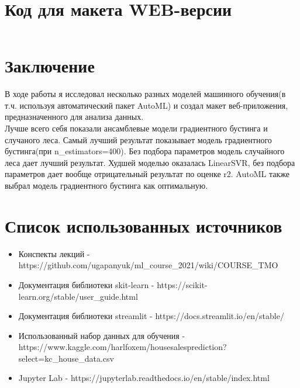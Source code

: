 \documentclass[11pt]{report}
\begin{document}
\chapter{Код для макета WEB-версии}
\inputminted[tabsize=4, linenos, breaklines]{python}{app.py}

\chapter{Заключение}

\qquad В ходе работы я исследовал несколько разных моделей машинного обучения(в т.ч. используя автоматический пакет AutoML) и создал макет веб-приложения, предназначенного для анализа данных. \\
\qquad Лучше всего себя показали ансамблевые модели градиентного бустинга и
случаного леса. Самый лучший результат показывает модель градиентного
бустинга(при n\_estimators=400). Без подбора параметров модель
случайного леса дает лучший результат. Худшей моделью оказалась
LinearSVR, без подбора параметров дает вообще отрицательный результат по
оценке r2. AutoML также выбрал модель градиентного бустинга как
оптимальную. \\

\chapter{Список использованных источников}
\begin{itemize}
		\item Конспекты лекций - https://github.com/ugapanyuk/ml\_course\_2021/wiki/COURSE\_TMO
		\item Документация библиотеки skit-learn - https://scikit-learn.org/stable/user\_guide.html
		\item Документация библиотеки streamlit - https://docs.streamlit.io/en/stable/
		\item Использованный набор данных для обучения - https://www.kaggle.com/harlfoxem/housesalesprediction?select=kc\_house\_data.csv
		\item Jupyter Lab - https://jupyterlab.readthedocs.io/en/stable/index.html
\end{itemize}

    
\end{document}
